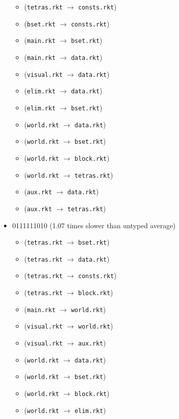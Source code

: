 \documentclass{article}
\newcommand{\mono}[1]{\texttt{#1}}
\begin{document}
\begin{itemize}
  \begin{itemize}
  \item (\mono{tetras.rkt} $\rightarrow$ \mono{consts.rkt})
  \item (\mono{bset.rkt} $\rightarrow$ \mono{consts.rkt})
  \item (\mono{main.rkt} $\rightarrow$ \mono{bset.rkt})
  \item (\mono{main.rkt} $\rightarrow$ \mono{data.rkt})
  \item (\mono{visual.rkt} $\rightarrow$ \mono{data.rkt})
  \item (\mono{elim.rkt} $\rightarrow$ \mono{data.rkt})
  \item (\mono{elim.rkt} $\rightarrow$ \mono{bset.rkt})
  \item (\mono{world.rkt} $\rightarrow$ \mono{data.rkt})
  \item (\mono{world.rkt} $\rightarrow$ \mono{bset.rkt})
  \item (\mono{world.rkt} $\rightarrow$ \mono{block.rkt})
  \item (\mono{world.rkt} $\rightarrow$ \mono{tetras.rkt})
  \item (\mono{aux.rkt} $\rightarrow$ \mono{data.rkt})
  \item (\mono{aux.rkt} $\rightarrow$ \mono{tetras.rkt})
  \end{itemize}
\item 0111111010 (1.07 times slower than untyped average)
  \begin{itemize}
  \item (\mono{tetras.rkt} $\rightarrow$ \mono{bset.rkt})
  \item (\mono{tetras.rkt} $\rightarrow$ \mono{data.rkt})
  \item (\mono{tetras.rkt} $\rightarrow$ \mono{consts.rkt})
  \item (\mono{tetras.rkt} $\rightarrow$ \mono{block.rkt})
  \item (\mono{main.rkt} $\rightarrow$ \mono{world.rkt})
  \item (\mono{visual.rkt} $\rightarrow$ \mono{world.rkt})
  \item (\mono{visual.rkt} $\rightarrow$ \mono{aux.rkt})
  \item (\mono{world.rkt} $\rightarrow$ \mono{data.rkt})
  \item (\mono{world.rkt} $\rightarrow$ \mono{bset.rkt})
  \item (\mono{world.rkt} $\rightarrow$ \mono{block.rkt})
  \item (\mono{world.rkt} $\rightarrow$ \mono{elim.rkt})

\end{itemize}
\end{itemize}
\end{document}
